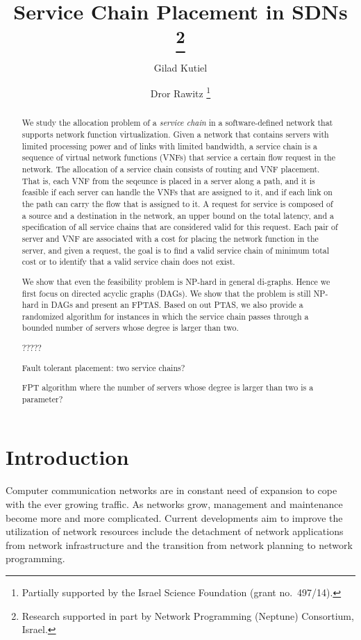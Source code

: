 \documentclass[runningheads]{llncs}
\title{\bf Service Chain Placement in SDNs%
\thanks{Research supported in part by Network Programming (Neptune)
  Consortium, Israel.}
}
\author{%
Gilad Kutiel
\and
Dror Rawitz%
\thanks{Partially supported by the Israel Science Foundation
  (grant no.~497/14).  }
}
\institute{%
Department of Computer Science, Technion, Haifa 32000, Israel. \\
\email{gkutiel@cs.technion.ac.il}
\and
Faculty of Engineering, Bar Ilan University, Ramt-Gan 52900, Israel.\\
\email{dror.rawitz@biu.ac.il}
}
\begin{document}
\maketitle

\begin{abstract}
We study the allocation problem of a \emph{service chain} in a
software-defined network that supports network function
virtualization.
%
Given a network that contains servers with limited processing power
and of links with limited bandwidth, a service chain is a sequence of
virtual network functions (VNFs) that service a certain flow request
in the network.
%
The allocation of a service chain consists of routing and VNF
placement.  That is, each VNF from the seqeunce is placed in a server
along a path, and it is feasible if each server can handle the VNFs
that are assigned to it, and if each link on the path can carry the
flow that is assigned to it.
%
A request for service is composed of a source and a destination in the
network, an upper bound on the total latency, and a specification of
all service chains that are considered valid for this request.
%
Each pair of server and VNF are associated with a cost for placing the
network function in the server, and given a request, the goal is to
find a valid service chain of minimum total cost or to identify that
a valid service chain does not exist.

We show that even the feasibility problem is NP-hard in general
di-graphs.  Hence we first focus on directed acyclic graphs (DAGs).
We show that the problem is still NP-hard in DAGs and present an
FPTAS.
%
Based on out PTAS, we also provide a randomized algorithm for
instances in which the service chain passes through a bounded number
of servers whose degree is larger than two.

?????

Fault tolerant placement: two service chains?

FPT algorithm where the number of servers whose degree is larger than
two is a parameter?
\end{abstract}


\section{Introduction}


Computer communication networks are in constant need of expansion to
cope with the ever growing traffic.  As networks grow, management and
maintenance become more and more complicated.
%
Current developments aim to improve the utilization of network
resources include the detachment of network applications from network
infrastructure and the transition from network planning to network
programming.
\end{document}
